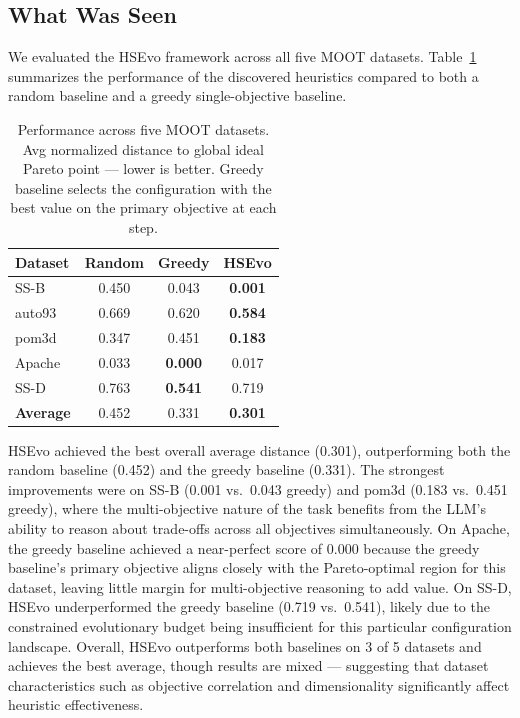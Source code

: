 \documentclass[sigconf,nonacm]{acmart}
\begin{document}
\subsection{What Was Seen}
We evaluated the HSEvo framework across all five MOOT datasets. Table~\ref{tab:moot-results} summarizes the performance of the discovered heuristics compared to both a random baseline and a greedy single-objective baseline.

\begin{table}[h]
\caption{Performance across five MOOT datasets. Avg normalized distance to global ideal Pareto point --- lower is better. Greedy baseline selects the configuration with the best value on the primary objective at each step.}
\label{tab:moot-results}
\begin{tabular}{lccc}
\toprule
\textbf{Dataset} & \textbf{Random} & \textbf{Greedy} & \textbf{HSEvo} \\
\midrule
SS-B    & 0.450 & 0.043 & \textbf{0.001} \\
auto93  & 0.669 & 0.620 & \textbf{0.584} \\
pom3d   & 0.347 & 0.451 & \textbf{0.183} \\
Apache  & 0.033 & \textbf{0.000} & 0.017 \\
SS-D    & 0.763 & \textbf{0.541} & 0.719 \\
\midrule
\textbf{Average} & 0.452 & 0.331 & \textbf{0.301} \\
\bottomrule
\end{tabular}
\end{table}

HSEvo achieved the best overall average distance (0.301), outperforming both the random baseline (0.452) and the greedy baseline (0.331). The strongest improvements were on SS-B (0.001 vs.\ 0.043 greedy) and pom3d (0.183 vs.\ 0.451 greedy), where the multi-objective nature of the task benefits from the LLM's ability to reason about trade-offs across all objectives simultaneously. On Apache, the greedy baseline achieved a near-perfect score of 0.000 because the greedy baseline's primary objective aligns closely with the Pareto-optimal region for this dataset, leaving little margin for multi-objective reasoning to add value. On SS-D, HSEvo underperformed the greedy baseline (0.719 vs.\ 0.541), likely due to the constrained evolutionary budget being insufficient for this particular configuration landscape. Overall, HSEvo outperforms both baselines on 3 of 5 datasets and achieves the best average, though results are mixed --- suggesting that dataset characteristics such as objective correlation and dimensionality significantly affect heuristic effectiveness.
\end{document}
